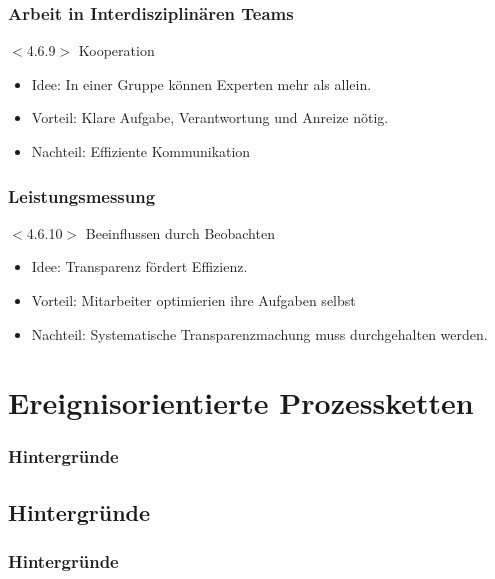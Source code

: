 \documentclass{beamer}
\begin{document}
 \begin{frame}
  \frametitle{Arbeit in Interdisziplinären Teams}
  $<$4.6.9$>$
  Kooperation
  \begin{itemize}
    \item Idee: In einer Gruppe können Experten mehr als allein.
    \item Vorteil: Klare Aufgabe, Verantwortung und Anreize nötig.
    \item Nachteil: Effiziente Kommunikation
  \end{itemize}
 \end{frame}

 \begin{frame}
  \frametitle{Leistungsmessung}
  $<$4.6.10$>$
  Beeinflussen durch Beobachten
  \begin{itemize}
    \item Idee: Transparenz fördert Effizienz.
    \item Vorteil: Mitarbeiter optimierien ihre Aufgaben selbst
    \item Nachteil: Systematische Transparenzmachung muss durchgehalten werden.
  \end{itemize}
 \end{frame}

 \section[Ereignisorientierte Prozessketten]{Ereignisorientierte Prozessketten}
 \begin{frame}
  \frametitle{Hintergründe}

 \end{frame}

 \subsection[Hintergründe]{Hintergründe}
 \begin{frame}
  \frametitle{Hintergründe}

 \end{frame}
\end{document}
